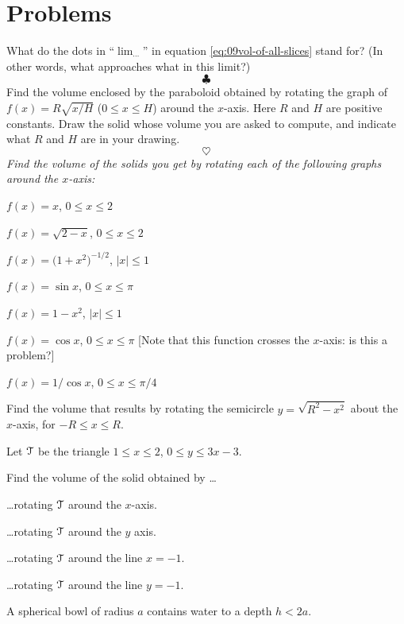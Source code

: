 \section{Problems} %
\problemfont %
\begin{multicols}{2}\setlength{\parindent}{0pt}
\problem \groupproblem What do the dots in ``$\lim_{\cdots}$'' in equation %
\eqref{eq:09vol-of-all-slices} stand for? (In other words, what approaches what
in this limit?)
\[
\clubsuit
\]
\problem  %
Find the volume enclosed by the paraboloid obtained by rotating the
graph of $f(x) = R \sqrt{x/H}$ ($0\leq x\leq H$) around the $x$-axis.
Here $R$ and $H$ are positive constants.  Draw the solid whose volume
you are asked to compute, and indicate what $R$ and $H$ are in your
drawing.
\[
\heartsuit
\]
\begingroup\itshape
Find the volume of the solids you get by rotating each of the
following graphs around the $x$-axis:
\endgroup

\problem $f(x) = x$, $0\leq x\leq 2$  %

\problem $f(x) = \sqrt{2-x}$, $0\leq x\leq 2$  %

\problem $f(x) = \bigl(1+x^2\bigr)^{-1/2}$, $|x|\leq1$  %

\problem $f(x) = \sin x$, $0\leq x\leq \pi$  %

\problem $f(x) = 1-x^2$, $|x|\leq 1$  %

\problem $f(x) = \cos x$, $0\leq x\leq \pi$  [Note that this function crosses %
the $x$-axis: is this a problem?]

\problem $f(x) = 1/\cos x$, $0\leq x\leq \pi/4$  %

\problem  \label{ex:SphereVolume} %
Find the volume that results by rotating the semicircle
$y=\sqrt{R^2-x^2}$ about the $x$-axis, for $-R \leq x \leq R$.

\problem Let $\mathcal{T}$ be the triangle $1\le x\le 2$, $0\le y\le 3x-3$. %
 
Find the volume of the solid obtained by \ldots

\subprob \ldots rotating $\mathcal{T}$ around the $x$-axis.

\subprob \ldots rotating $\mathcal{T}$ around the $y$ axis.

\subprob \ldots rotating $\mathcal{T}$ around the line $x=-1$.

\subprob \ldots rotating $\mathcal{T}$ around the line $y=-1$.



\problem A spherical bowl of radius $a$ contains water to a %
depth $h<2a$. 


\end{multicols}

